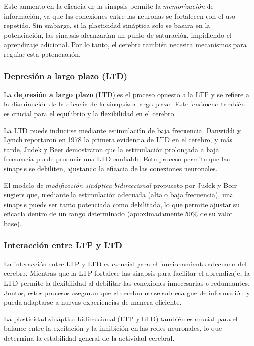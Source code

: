 \documentclass[12pt, letterpaper]{article}
\begin{document}
Este aumento en la eficacia de la sinapsis permite la \textit{memorización} de información, ya que las conexiones entre las neuronas se fortalecen con el uso repetido. Sin embargo, si la plasticidad sináptica solo se basara en la potenciación, las sinapsis alcanzarían un punto de saturación, impidiendo el aprendizaje adicional. Por lo tanto, el cerebro también necesita mecanismos para regular esta potenciación.

\subsubsection{Depresión a largo plazo (LTD)}
La \textbf{depresión a largo plazo} (LTD) es el proceso opuesto a la LTP y se refiere a la disminución de la eficacia de la sinapsis a largo plazo. Este fenómeno también es crucial para el equilibrio y la flexibilidad en el cerebro.

La LTD puede inducirse mediante estimulación de baja frecuencia. Danwiddi y Lynch reportaron en 1978 la primera evidencia de LTD en el cerebro, y más tarde, Judek y Beer demostraron que la estimulación prolongada a baja frecuencia puede producir una LTD confiable. Este proceso permite que las sinapsis se debiliten, ajustando la eficacia de las conexiones neuronales.

El modelo de \textit{modificación sináptica bidireccional} propuesto por Judek y Beer sugiere que, mediante la estimulación adecuada (alta o baja frecuencia), una sinapsis puede ser tanto potenciada como debilitada, lo que permite ajustar su eficacia dentro de un rango determinado (aproximadamente 50\% de su valor base).

\subsubsection{Interacción entre LTP y LTD}
La interacción entre LTP y LTD es esencial para el funcionamiento adecuado del cerebro. Mientras que la LTP fortalece las sinapsis para facilitar el aprendizaje, la LTD permite la flexibilidad al debilitar las conexiones innecesarias o redundantes. Juntos, estos procesos aseguran que el cerebro no se sobrecargue de información y pueda adaptarse a nuevas experiencias de manera eficiente.

La plasticidad sináptica bidireccional (LTP y LTD) también es crucial para el balance entre la excitación y la inhibición en las redes neuronales, lo que determina la estabilidad general de la actividad cerebral.
\end{document}
